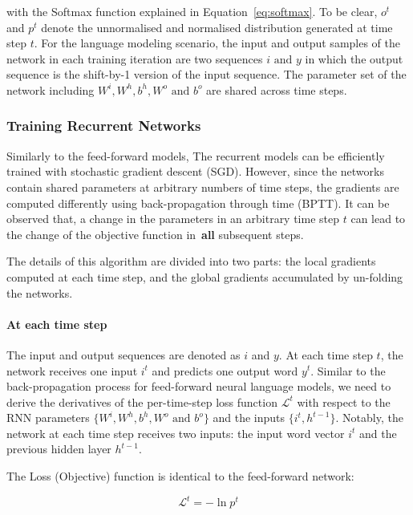 with the Softmax function explained in Equation~\ref{eq:softmax}. To be clear, $o^t$ and $p^t$ denote the unnormalised and normalised distribution generated at time step $t$. For the language modeling scenario, the input and output samples of the network in each training iteration are two sequences $i \text{ and } y$ in which the output sequence is the shift-by-1 version of the input sequence. The parameter set of the network including $W^i, W^h, b^h, W^o \text{ and } b^o$ are shared across time steps. 


\subsubsection{Training Recurrent Networks}

Similarly to the feed-forward models, The recurrent models can be efficiently trained with stochastic gradient descent (SGD). However, since the networks contain shared parameters at arbitrary numbers of time steps, the gradients are computed differently using back-propagation through time (BPTT). It can be observed that, a change in the parameters in an arbitrary time step $t$ can lead to the change of the objective function in~\textbf{all} subsequent steps.

The details of this algorithm are divided into two parts: the local gradients computed at each time step, and the global gradients accumulated by un-folding the networks. 

\paragraph{At each time step} The input and output sequences are denoted as $i$ and $y$. At each time step $t$, the network receives one input $i^t$ and predicts one output word $y^t$. Similar to the back-propagation process for feed-forward neural language models, we need to derive the derivatives of the per-time-step loss function $\mathcal{L}^t$ with respect to the RNN parameters $\{ W^i, W^h, b^h, W^o \text{ and } b^o \}$ and the inputs $\{i^t, h^{t-1}\}$. Notably, the network at each time step receives two inputs: the input word vector $i^t$ and the previous hidden layer $h^{t-1}$. 

The Loss (Objective) function is identical to the feed-forward network:

\begin{equation}
\mathcal{L}^t = - \ln p^t 
\end{equation}

